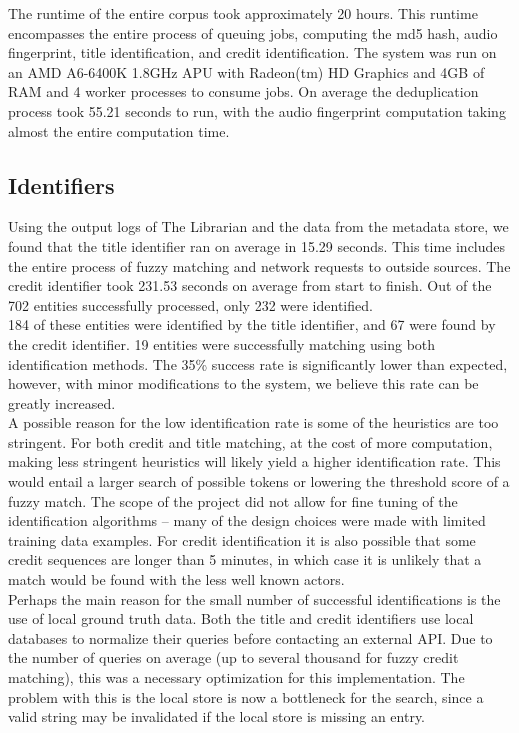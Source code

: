 \documentclass[paper=a4, fontsize=11pt]{scrartcl} %
\numberwithin{equation}{section} %
\numberwithin{figure}{section} %
\numberwithin{table}{section} %
\begin{document}
The runtime of the entire corpus took approximately 20 hours. This runtime encompasses the entire process of queuing jobs, computing the md5 hash, audio fingerprint, title identification, and credit identification. The system was run on an AMD A6-6400K 1.8GHz APU with Radeon(tm) HD Graphics and 4GB of RAM and 4 worker processes to consume jobs. On average the deduplication process took 55.21 seconds to run, with the audio fingerprint computation taking almost the entire computation time. \\

\subsection{Identifiers}
\label{sec:identifiers-performance}
Using the output logs of The Librarian and the data from the metadata store, we found that the title identifier ran on average in 15.29 seconds. This time includes the entire process of fuzzy matching and network requests to outside sources. The credit identifier took 231.53 seconds on average from start to finish. Out of the 702 entities successfully processed, only 232 were identified. \\

184 of these entities were identified by the title identifier, and 67 were found by the credit identifier. 19 entities were successfully matching using both identification methods. The 35\% success rate is significantly lower than expected, however, with minor modifications to the system, we believe this rate can be greatly increased. \\

A possible reason for the low identification rate is some of the heuristics are too stringent. For both credit and title matching, at the cost of more computation, making less stringent heuristics will likely yield a higher identification rate. This would entail a larger search of possible tokens or lowering the threshold score of a fuzzy match. The scope of the project did not allow for fine tuning of the identification algorithms -- many of the design choices were made with limited training data examples. For credit identification it is also possible that some credit sequences are longer than 5 minutes, in which case it is unlikely that a match would be found with the less well known actors. \\

Perhaps the main reason for the small number of successful identifications is the use of local ground truth data. Both the title and credit identifiers use local databases to normalize their queries before contacting an external API. Due to the number of queries on average (up to several thousand for fuzzy credit matching), this was a necessary optimization for this implementation. The problem with this is the local store is now a bottleneck for the search, since a valid string may be invalidated if the local store is missing an entry. \\
\end{document}
